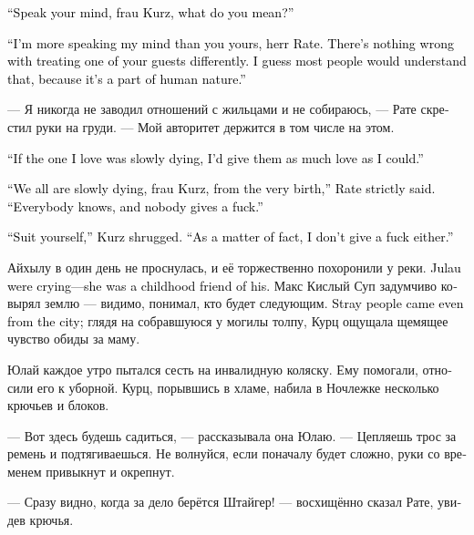 \documentclass[a4paper,12pt,fleqn]{book}\usepackage{cooltooltips}\usepackage{polyglossia}\setdefaultlanguage[babelshorthands=true]{russian}\setotherlanguage{english}\defaultfontfeatures{Ligatures=TeX,Mapping=tex-text} \usepackage{xcolor}\definecolor{lightgray}{HTML}{bbbbbb}\color{lightgray}\newcommand{\ml}[3]{\textenglish{\textcolor{black}{#3}}}
\newcommand{\textspace}{\vspace{1em}{\centering\Large\bfseries<...>\par}\vspace{1em}}
\begin{document}
\ml{$0$}
{--- Говори прямо, фрау Курц, что ты имеешь в виду?}
{``Speak your mind, frau Kurz, what do you mean?''}

\ml{$0$}
{--- Я была гораздо более пряма, чем ты, герр Рате.}
{``I'm more speaking my mind than you yours, herr Rate.}
\ml{$0$}
{Нет ничего плохого в том, чтобы к одному из жильцов относиться иначе, чем к остальным.}
{There's nothing wrong with treating one of your guests differently.}
\ml{$0$}
{Я думаю, люди бы это поняли, потому что это часть человеческой природы.}
{I guess most people would understand that, because it's a part of human nature.''}

--- Я никогда не заводил отношений с жильцами и не собираюсь, --- Рате скрестил руки на груди.
--- Мой авторитет держится в том числе на этом.

\ml{$0$}
{--- Если бы человек, которого я люблю, медленно умирал, я хотела бы отдать ему как можно больше любви.}
{``If the one I love was slowly dying, I'd give them as much love as I could.''}

\ml{$0$}
{--- Все мы медленно умираем, фрау Курц, с самого рождения, --- строго сказал Рате.}
{``We all are slowly dying, frau Kurz, from the very birth,'' Rate strictly said.}
\ml{$0$}
{--- Все об этом знают, и всем плевать.}
{``Everybody knows, and nobody gives a fuck.''}

\ml{$0$}
{--- Дело твоё, --- пожала плечами Курц.}
{``Suit yourself,'' Kurz shrugged.}
\ml{$0$}
{--- Мне, в общем-то, тоже плевать.}
{``As a matter of fact, I don't give a fuck either.''}

Айхылу в один день не проснулась, и её торжественно похоронили у реки.
\ml{$0$}
{Юлай плакал --- она была его подругой детства.}
{Julau were crying---she was a childhood friend of his.}
Макс Кислый Суп задумчиво ковырял землю --- видимо, понимал, кто будет следующим.
\ml{$0$}
{Бездомные пришли даже из города;}
{Stray people came even from the city;}
глядя на собравшуюся у могилы толпу, Курц ощущала щемящее чувство обиды за маму.

\textspace

Юлай каждое утро пытался сесть на инвалидную коляску.
Ему помогали, относили его к уборной.
Курц, порывшись в хламе, набила в Ночлежке несколько крючьев и блоков.

--- Вот здесь будешь садиться, --- рассказывала она Юлаю.
--- Цепляешь трос за ремень и подтягиваешься.
Не волнуйся, если поначалу будет сложно, руки со временем привыкнут и окрепнут.

--- Сразу видно, когда за дело берётся Штайгер! --- восхищённо сказал Рате, увидев крючья.
\end{document}
